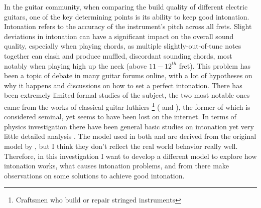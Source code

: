 In the guitar community, when comparing the build quality of different electric guitars, one of the key determining points is its ability to keep good intonation. Intonation refers to the accuracy of the instrument’s pitch across all frets. Slight deviations in intonation can have a significant impact on the overall sound quality, especially when playing chords, as multiple slightly-out-of-tune notes together can clash and produce muffled, discordant sounding chords, most notably when playing high up the neck (above $11-12^{th}$ fret). This problem has been a topic of debate in many guitar forums online, with a lot of hypotheses on why it happens and discussions on how to set a perfect intonation. There has been extremely limited formal studies of the subject, the two most notable ones came from the works of classical guitar luthiers \footnote{Craftsmen who build or repair stringed instruments} (\cite{bartolinis} and \cite{byers}), the former of which is considered seminal, yet seems to have been lost on the internet. In terms of physics investigation there have been general basic studies on intonation yet very little detailed analysis \cite{varieschi}. The model used in both \cite{byers} and \cite{varieschi} are derived from the original model by \cite{bartolinis}, but I think they don't reflect the real world behavior really well. Therefore, in this investigation I want to develop a different model to explore how intonation works, what causes intonation problems, and from there make observations on some solutions to achieve good intonation.